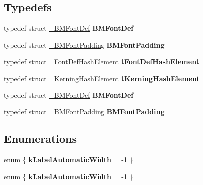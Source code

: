 \subsection*{Typedefs}
\begin{DoxyCompactItemize}
\item 
\mbox{\label{group__label_gac487f725317559c875bb2d2d3adf86b1}} 
typedef struct \hyperlink{struct__BMFontDef}{\+\_\+\+B\+M\+Font\+Def} {\bfseries B\+M\+Font\+Def}
\item 
\mbox{\label{group__label_ga71de169a485c89d44fde95c211ed0c8d}} 
typedef struct \hyperlink{struct__BMFontPadding}{\+\_\+\+B\+M\+Font\+Padding} {\bfseries B\+M\+Font\+Padding}
\item 
\mbox{\label{group__label_gae8dc5645efa817dbf6580c80581823e5}} 
typedef struct \hyperlink{struct__FontDefHashElement}{\+\_\+\+Font\+Def\+Hash\+Element} {\bfseries t\+Font\+Def\+Hash\+Element}
\item 
\mbox{\label{group__label_gac9dc358a19db328b4bc9b52454afedb0}} 
typedef struct \hyperlink{struct__KerningHashElement}{\+\_\+\+Kerning\+Hash\+Element} {\bfseries t\+Kerning\+Hash\+Element}
\item 
\mbox{\label{group__label_gac487f725317559c875bb2d2d3adf86b1}} 
typedef struct \hyperlink{struct__BMFontDef}{\+\_\+\+B\+M\+Font\+Def} {\bfseries B\+M\+Font\+Def}
\item 
\mbox{\label{group__label_ga71de169a485c89d44fde95c211ed0c8d}} 
typedef struct \hyperlink{struct__BMFontPadding}{\+\_\+\+B\+M\+Font\+Padding} {\bfseries B\+M\+Font\+Padding}
\end{DoxyCompactItemize}
\subsection*{Enumerations}
\begin{DoxyCompactItemize}
\item 
\mbox{\label{group__label_ga726ca809ffd3d67ab4b8476646f26635}} 
enum \{ {\bfseries k\+Label\+Automatic\+Width} = -\/1
 \}
\item 
\mbox{\label{group__label_ga20a66f99673ff3efefccf3a6a6f19f65}} 
enum \{ {\bfseries k\+Label\+Automatic\+Width} = -\/1
 \}
\end{DoxyCompactItemize}
